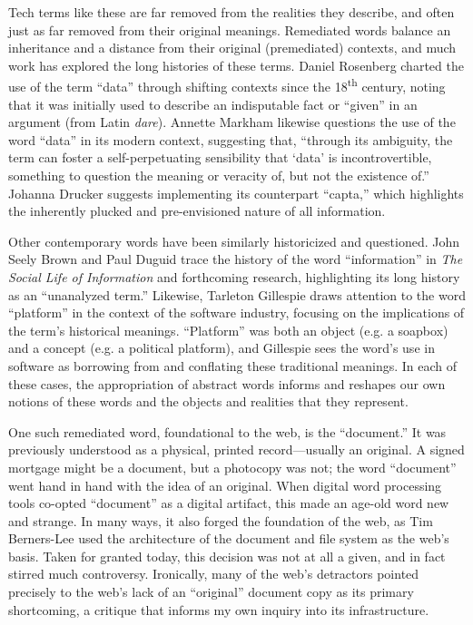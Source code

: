 Tech terms like these are far removed from the realities they describe, and often just as far removed from their original meanings. Remediated words balance an inheritance and a distance from their original (premediated) contexts, and much work has explored the long histories of these terms. Daniel Rosenberg charted the use of the term ``data'' through shifting contexts since the 18\textsuperscript{th} century, noting that it was initially used to describe an indisputable fact or ``given'' in an argument (from Latin \emph{dare}).\autocite{rosenberg}  Annette Markham likewise questions the use of the word ``data'' in its modern context, suggesting that, ``through its ambiguity, the term can foster a self-perpetuating sensibility that `data' is incontrovertible, something to question the meaning or veracity of, but not the existence of.''\autocite{markham} Johanna Drucker suggests implementing its counterpart ``capta,'' which highlights the inherently plucked and pre-envisioned nature of all information.\autocite{drucker}

Other contemporary words have been similarly historicized and questioned. John Seely Brown and Paul Duguid trace the history of the word ``information'' in \emph{The Social Life of Information} and forthcoming research, highlighting its long history as an ``unanalyzed term.''\autocite{duguid} Likewise, Tarleton Gillespie draws attention to the word ``platform'' in the context of the software industry, focusing on the implications of the term's historical meanings.\autocite{gillespie_politics} ``Platform'' was both an object (e.g. a soapbox) and a concept (e.g. a political platform), and Gillespie sees the word's use in software as borrowing from and conflating these traditional meanings. In each of these cases, the appropriation of abstract words informs and reshapes our own notions of these words and the objects and realities that they represent.

One such remediated word, foundational to the web, is the ``document.'' It was previously understood as a physical, printed record---usually an original. A signed mortgage might be a document, but a photocopy was not; the word ``document'' went hand in hand with the idea of an original. When digital word processing tools co-opted ``document'' as a digital artifact, this made an age-old word new and strange. In many ways, it also forged the foundation of the web, as Tim Berners-Lee used the architecture of the document and file system as the web's basis.\autocite{berners-lee} Taken for granted today, this decision was not at all a given, and in fact stirred much controversy. Ironically, many of the web's detractors pointed precisely to the web's lack of an ``original'' document copy as its primary shortcoming, a critique that informs my own inquiry into its infrastructure.\autocite{nelson_one_liners}

